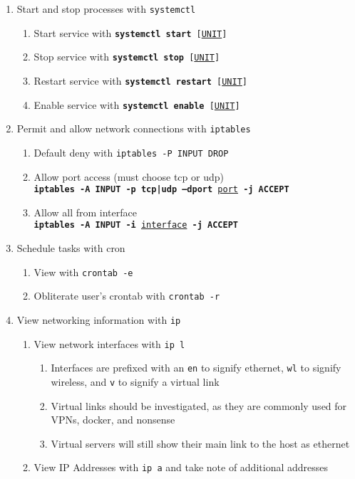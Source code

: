 \documentclass[12pt,letterpaper]{article}
\def\code#1{\textcolor{c2}{\texttt{#1}}}
\def\bf#1{\textbf{#1}}
\def\ul#1{\underline{#1}}
\begin{document}
\begin{enumerate}
	\item Start and stop processes with \code{systemctl}
	\begin{enumerate}
		\item Start service with \code{\bf{systemctl start} [\ul{UNIT}]}
		\item Stop service with \code{\bf{systemctl stop} [\ul{UNIT}]}
		\item Restart service with \code{\bf{systemctl restart} [\ul{UNIT}]}
		\item Enable service with \code{\bf{systemctl enable} [\ul{UNIT}]}
	\end{enumerate}
	\item Permit and allow network connections with \code{iptables}
	\begin{enumerate}
		\item Default deny with \code{iptables -P INPUT DROP}
		\item Allow port access (must choose tcp or udp) \\
			\code{\bf{iptables -A INPUT -p tcp|udp --dport} \ul{port} \bf{-j ACCEPT}}
		\item Allow all from interface \\
			\code{\bf{iptables -A INPUT -i} \ul{interface} \bf{-j ACCEPT}}
	\end{enumerate}
	\item Schedule tasks with cron
	\begin{enumerate}
		\item View with \code{crontab -e}
		\item Obliterate user's crontab with \code{crontab -r}
	\end{enumerate}
	\item View networking information with \code{ip}
		\begin{enumerate}
			\item View network interfaces with \code{ip l}
				\begin{enumerate}
					\item Interfaces are prefixed with an \code{en} to signify ethernet, \code{wl} to signify wireless, and \code{v} to signify a virtual link
					\item Virtual links should be investigated, as they are commonly used for VPNs, docker, and nonsense
					\item Virtual servers will still show their main link to the host as ethernet
				\end{enumerate}
			\item View IP Addresses with \code{ip a} and take note of additional addresses
		\end{enumerate}
\end{enumerate}
\end{document}
